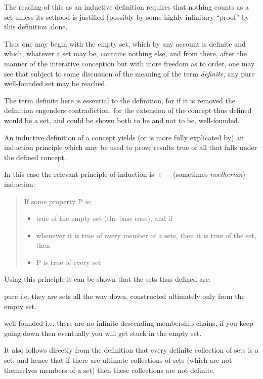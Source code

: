 The reading of this as an inductive definition requires that nothing counts as a set unless its sethood is justified (possibly by some highly infinitary ``proof'' by this definition alone.

Thus one may begin with the empty set, which by any account is definite and which, whatever a set may be, contains nothing else, and from there, after the manner of the interative conception but with more freedom as to order, one may see that subject to some discussion of the meaning of the term {\it definite}, any pure well-founded set may be reached.

The term definite here is essential to the definition, for if it is removed the definition engenders contradiction, for the extension of the concept thus defined would be a set, and could be shown both to be and not to be, well-founded.

An inductive definition of a concept yields (or is more fully explicated by) an induction principle which may be used to prove results true of all that falls under the defined concept.

In this case the relevant principle of induction is $\in-$ (sometimes {\it noetherian}) induction:

\begin{quote}
If some property P is:
\begin{itemize}
\item true of the empty set (the base case), and if
\item whenever it is true of every member of a sets, then it is true of the set, then
\item P is true of every set
\end{itemize}
\end{quote}

Using this principle it can be shown that the sets thus defined are:

\begin{compactdesc}
\item[pure] i.e. they are sets all the way down, constructed ultimately only from the empty set.
\item[well-founded] i.e. there are no infinite descending membership chains, if you keep going down then eventually you will get stuck in the empty set.
\end{compactdesc}

It also follows directly from the definition that every definite collection of sets is a set, and hence that if there are ultimate collections of sets (which are not themselves members of a set) then these collections are not definite.

